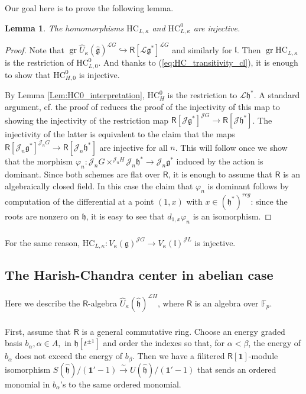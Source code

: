 \documentclass{amsart}
\newtheorem{Lem}[Thm]{Lemma}
\theoremstyle{definition}
\newcommand{\sss}{\subsubsection{}}
\newcommand{\Ring}{\mathsf{R}}
\newcommand{\g}{\mathfrak{g}}
\newcommand{\gr}{\operatorname{gr}}
\newcommand{\h}{\mathfrak{h}}
\newcommand{\hh}{\hat{\mathfrak{h}}}
\newcommand{\HC}{\mathrm{HC}} %
\newcommand{\lf}{\mathfrak{l}}
\newcommand{\Jet}{\mathscr{J}}
\newcommand{\Loop}{\mathscr{L}}
\numberwithin{equation}{section}
\begin{document}
\sss Our goal here is to prove the following lemma. 
\begin{Lem}\label{Lem:HC_injectivity}
The homomorphisms $\HC_{L,\kappa}$ and $\HC_{L,\kappa}^0$
are injective. 
\end{Lem}
\begin{proof}
Note that $\gr \widehat{U}_\kappa(\hat{\g})^{\Loop G}\hookrightarrow \Ring[\Loop \g^*]^{\Loop G}$ and similarly for $\lf$. Then $\gr \HC_{L,\kappa}$ is the restriction of $\HC^0_{L,0}$. And thanks to (\ref{eq:HC_transitivity_cl}), it is enough to show that $\HC^0_{H,0}$ is injective. 

By Lemma \ref{Lem:HC0_interpretation}, $\HC^0_H$ is the restriction to $\Loop \h^*$. A standard argument, cf. the proof of \cite[Proposition 4.3.4]{Frenkel_loop} reduces the proof of the injectivity of this map to showing the injectivity of the restriction map $\Ring[\Jet \g^*]^{\Jet G}\rightarrow \Ring[\Jet \mathfrak{h}^*]$. The injectivity of the latter is equivalent to the claim that the maps $\Ring[\Jet_n \g^*]^{\Jet_n G}\rightarrow \Ring[\Jet_n \mathfrak{h}^*]$ are injective for all $n$. This will follow once we show that the morphism $\varphi_n:\Jet_nG\times^{\Jet_n H}\Jet_n\mathfrak{h}^*\rightarrow \Jet_n\g^*$ induced by the action is dominant. Since both schemes are flat over $\Ring$, it is enough to assume that $\Ring$ is an algebraically closed field. In this case the claim that $\varphi_n$ is dominant follows by computation of the differential at a point $(1,x)$ with $x\in (\mathfrak{h}^*)^{reg}$: since the roots are nonzero on $\mathfrak{h}$, it is easy to see that $d_{1,x}\varphi_n$ is an isomorphism.  
\end{proof}

\sss\label{SSS_vertex_algebra_injectivity} For the same reason, $\HC_{L,\kappa}: V_\kappa(\g)^{\Jet G}\rightarrow V_\kappa(\lf)^{\Jet L}$ is injective. 


\subsection{The Harish-Chandra center in abelian case}
Here we describe the $\Ring$-algebra $\widehat{U}_\kappa(\hh)^{\Loop H}$, where $\Ring$ is an algebra over $\mathbb{F}_p$. 

\sss 
First, assume that $\Ring$ is a general commutative ring. Choose an energy graded basis $b_\alpha, \alpha\in A,$ in $\h[t^{\pm 1}]$ and
order the indexes so that, for $\alpha<\beta$, the energy of $b_\alpha$ does not exceed the energy of $b_\beta$. Then we have 
a filitered $\Ring[\mathbf{1}]$-module isomorphism $S(\hh)/(\mathbf{1}'-1)\xrightarrow{\sim} U(\hh)/(\mathbf{1}'-1)$ that sends an ordered monomial in $b_\alpha$'s to the same ordered monomial. 
\end{document}
